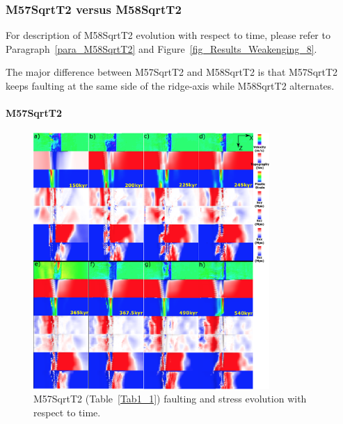 \subsubsection{M57SqrtT2 versus M58SqrtT2}

For description of M58SqrtT2 evolution with respect to time, please refer to Paragraph~\hyperref[para_M58SqrtT2]{\ref{para_M58SqrtT2}} and Figure~\hyperref[fig_Results_Weakenging_8]{\ref{fig_Results_Weakenging_8}}.

The major difference between M57SqrtT2 and M58SqrtT2 is that M57SqrtT2 keeps faulting at the same side of the ridge-axis while M58SqrtT2 alternates.

\paragraph{M57SqrtT2}

\begin{figure}[h]
 \centering
  \includegraphics[width=0.8\textwidth]{./Figures/fig_Results_MRange_3_M57SqrtT2_time_evolution.eps}
 \caption{M57SqrtT2 (Table~\hyperref[Tab1_1]{\ref{Tab1_1}}) faulting and stress evolution with respect to time.}
\label{fig_Results_MRange_3}
\end{figure}

